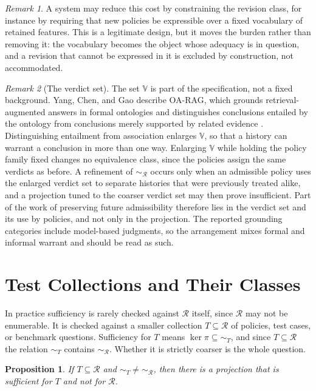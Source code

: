 \documentclass[11pt]{article}
\newtheorem{proposition}{Proposition}
\theoremstyle{remark}
\newtheorem{remark}{Remark}
\newcommand{\Rev}{\mathcal{R}}
\newcommand{\Vset}{\mathbb{V}}
\renewcommand{\ker}{\operatorname{ker}}
\begin{document}
\begin{remark}
A system may reduce this cost by constraining the revision class, for instance by requiring that new policies be expressible over a fixed vocabulary of retained features. This is a legitimate design, but it moves the burden rather than removing it: the vocabulary becomes the object whose adequacy is in question, and a revision that cannot be expressed in it is excluded by construction, not accommodated.
\end{remark}

\begin{remark}[The verdict set]
The set $\Vset$ is part of the specification, not a fixed background. Yang, Chen, and Gao describe OA-RAG, which grounds retrieval-augmented answers in formal ontologies and distinguishes conclusions entailed by the ontology from conclusions merely supported by related evidence \cite{yang2026oarag}. Distinguishing entailment from association enlarges $\Vset$, so that a history can warrant a conclusion in more than one way. Enlarging $\Vset$ while holding the policy family fixed changes no equivalence class, since the policies assign the same verdicts as before. A refinement of $\sim_{\Rev}$ occurs only when an admissible policy uses the enlarged verdict set to separate histories that were previously treated alike, and a projection tuned to the coarser verdict set may then prove insufficient. Part of the work of preserving future admissibility therefore lies in the verdict set and its use by policies, and not only in the projection. The reported grounding categories include model-based judgments, so the arrangement mixes formal and informal warrant and should be read as such.
\end{remark}


\section{Test Collections and Their Classes}

In practice sufficiency is rarely checked against $\Rev$ itself, since $\Rev$ may not be enumerable. It is checked against a smaller collection $T\subseteq\Rev$ of policies, test cases, or benchmark questions. Sufficiency for $T$ means $\ker\pi\subseteq{\sim_T}$, and since $T\subseteq\Rev$ the relation $\sim_T$ contains $\sim_{\Rev}$. Whether it is strictly coarser is the whole question.

\begin{proposition}\label{prop:sample}
If $T\subseteq\Rev$ and $\sim_T\ne\sim_{\Rev}$, then there is a projection that is sufficient for $T$ and not for $\Rev$.
\end{proposition}
\end{document}

